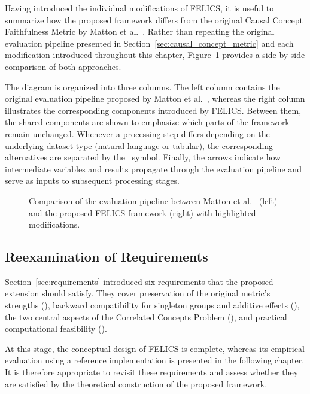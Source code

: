 Having introduced the individual modifications of FELICS, it is useful to summarize how the proposed framework differs from the original Causal Concept Faithfulness Metric by Matton et al.~\cite{mattonWalkTalkMeasuring2024}. Rather than repeating the original evaluation pipeline presented in Section~\ref{sec:causal_concept_metric} and each modification introduced throughout this chapter, Figure~\ref{fig:comparison_matton_felics} provides a side-by-side comparison of both approaches.

The diagram is organized into three columns. The left column contains the original evaluation pipeline proposed by Matton et al.~\cite{mattonWalkTalkMeasuring2024}, whereas the right column illustrates the corresponding components introduced by FELICS. Between them, the shared components are shown to emphasize which parts of the framework remain unchanged. Whenever a processing step differs depending on the underlying dataset type (natural-language or tabular), the corresponding alternatives are separated by the \textbullet\ symbol. Finally, the arrows indicate how intermediate variables and results propagate through the evaluation pipeline and serve as inputs to subsequent processing stages.

\begin{figure}
	\centering
	
	\caption{Comparison of the evaluation pipeline between Matton et al.~\cite{mattonWalkTalkMeasuring2024} (left) and the proposed FELICS framework (right) with highlighted modifications.}
	\label{fig:comparison_matton_felics}
\end{figure}

\subsection{Reexamination of Requirements}
\label{sec:requirements_reexamination}
Section~\ref{sec:requirements} introduced six requirements that the proposed extension should satisfy. They cover preservation of the original metric's strengths (), backward compatibility for singleton groups and additive effects (), the two central aspects of the Correlated Concepts Problem (), and practical computational feasibility ().

At this stage, the conceptual design of FELICS is complete, whereas its empirical evaluation using a reference implementation is presented in the following chapter. It is therefore appropriate to revisit these requirements and assess whether they are satisfied by the theoretical construction of the proposed framework.

